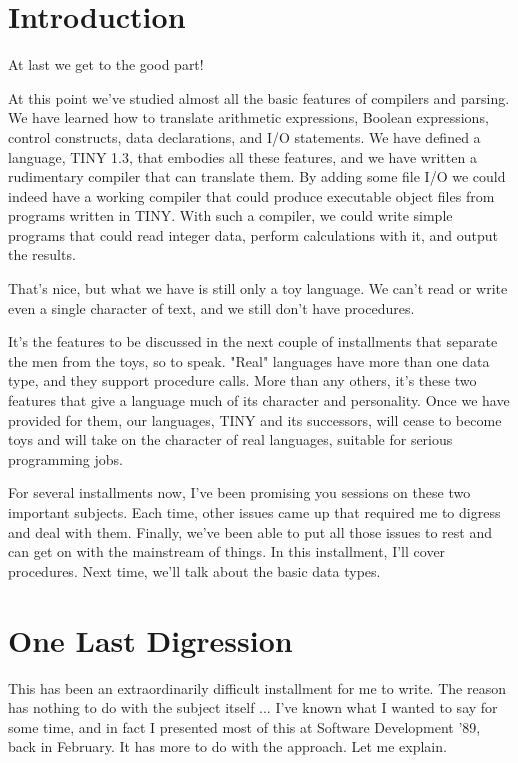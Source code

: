 \documentclass[float=false, crop=false]{standalone}
\begin{document}
\section{Introduction}

At last we get to the good part!

At this point we've studied almost all the basic features of compilers and
parsing. We have learned how to translate arithmetic expressions, Boolean
expressions, control constructs, data declarations, and I/O statements. We have
defined a language, TINY 1.3, that embodies all these features, and we have
written a rudimentary compiler that can translate them. By adding some file I/O
we could indeed have a working compiler that could produce executable object
files from programs written in TINY. With such a compiler, we could write simple
programs that could read integer data, perform calculations with it, and output
the results.

That's nice, but what we have is still only a toy language. We can't read or
write even a single character of text, and we still don't have procedures.

It's the features to be discussed in the next couple of installments that
separate the men from the toys, so to speak. "Real" languages have more than one
data type, and they support procedure calls. More than any others, it's these
two features that give a language much of its character and personality. Once we
have provided for them, our languages, TINY and its successors, will cease to
become toys and will take on the character of real languages, suitable for
serious programming jobs.

For several installments now, I've been promising you sessions on these two
important subjects. Each time, other issues came up that required me to digress
and deal with them. Finally, we've been able to put all those issues to rest and
can get on with the mainstream of things. In this installment, I'll cover
procedures. Next time, we'll talk about the basic data types.


\section{One Last Digression}

This has been an extraordinarily difficult installment for me to write. The
reason has nothing to do with the subject itself ... I've known what I wanted to
say for some time, and in fact I presented most of this at Software Development
'89, back in February. It has more to do with the approach. Let me explain.
\end{document}
